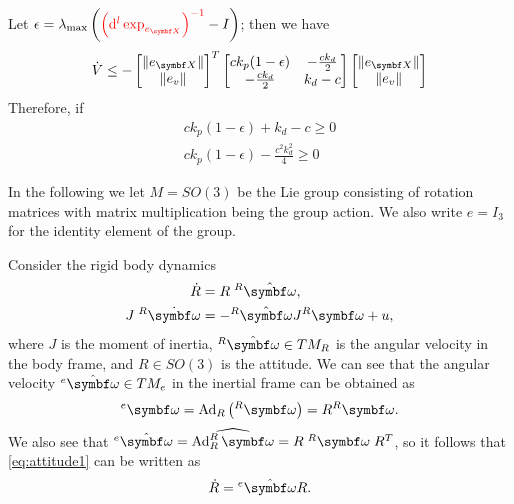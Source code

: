 Let $\epsilon = \lambda_\textrm{max} \left( \textcolor{red}{\left(\mathrm{d}^l \exp_{e_\X} \right)^{-1}} - I \right)$; then we have
\begin{equation}
  \dot V \leq -\begin{bmatrix} \| e_\X \| \\ \| e_v \| \end{bmatrix}^T \begin{bmatrix} c k_p (1 - \epsilon) & -\frac{c k_d}{2} \\ -\frac{c k_d}{2} & k_d - c \end{bmatrix} \begin{bmatrix} \| e_\X \| \\ \| e_v \| \end{bmatrix}
\end{equation}
Therefore, if
\begin{equation}
  \begin{aligned}
    c k_p (1 - \epsilon) + k_d - c \geq 0 \\
    c k_p (1 - \epsilon) - \frac{c^2 k_d^2}{4}  \geq 0
  \end{aligned}
\end{equation}


In the following we let $M = SO(3)$ be the Lie group consisting of rotation matrices with matrix multiplication being the group action. We also write $e = I_3$ for the identity element of the group.

Consider the rigid body dynamics
\begin{subequations}
  \label{eq:attitude}
  \begin{align}
    \label{eq:attitude1} \dot R                 & = R \; {^R\hat \bomega},              \\
    \label{eq:attitude2} J \; {^R\dot{\bomega}} & = -{^R\hat\bomega} J {^R\bomega} + u,
  \end{align}
\end{subequations}
where $J$ is the moment of inertia, ${^R \hat \bomega} \in T M_R$ is the angular velocity in the body frame, and $R \in SO(3)$ is the attitude. We can see that the angular velocity ${^{e} \hat\bomega} \in T M_{e}$ in the inertial frame can be obtained as
\begin{equation}
  ^{e} \bomega = \Ad_R \left( ^R\bomega \right) = R {^R\bomega}.
\end{equation}
We also see that $^e \hat\bomega = \widehat {\Ad_R ^R\bomega } = R  \; {^R\bomega} \; R^T$, so it follows that \eqref{eq:attitude1} can be written as
\begin{equation}
  \dot R = {^e\hat\bomega} R.
\end{equation}

